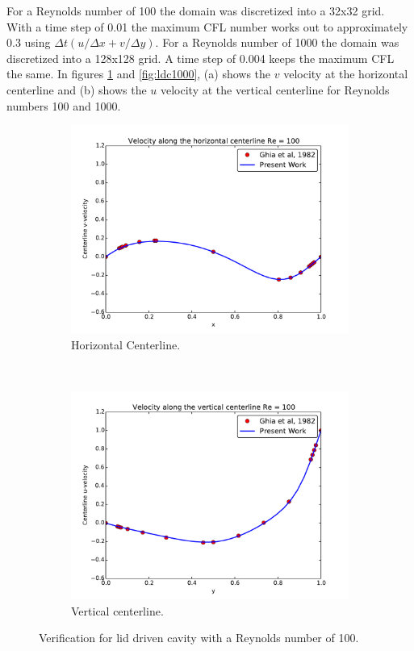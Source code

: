 \documentclass[onehalf,11pt]{beavtex}
\begin{document}
For a Reynolds number of 100 the domain was discretized into a 32x32 grid. 
With a time step of 0.01 the maximum CFL number works out to approximately 0.3 using $\Delta t(u/\Delta x+v/\Delta y)$.
For a Reynolds number of 1000 the domain was discretized into a 128x128 grid. 
A time step of 0.004 keeps the maximum CFL the same.
In figures \ref{fig:ldc100} and \ref{fig:ldc1000}, (a) shows the $v$ velocity at the horizontal centerline and (b) shows the $u$ velocity at the vertical centerline for Reynolds numbers 100 and 1000.
\begin{figure}[h]
	\centering
	\begin{subfigure}{0.4\textwidth}
		\includegraphics[width=\linewidth]{ldc_horizontal_100}
		\caption{Horizontal Centerline.}		
	\end{subfigure}
	~
	\begin{subfigure}{0.4\textwidth}
		\includegraphics[width=\linewidth]{ldc_vertical_100}
		\caption{Vertical centerline.}		
	\end{subfigure}
	\caption{Verification for lid driven cavity with a Reynolds number of 100.}
	\label{fig:ldc100}
\end{figure}
\end{document}
